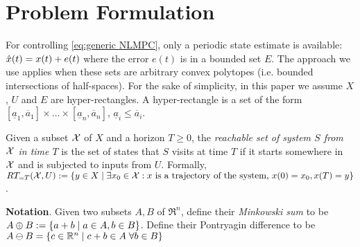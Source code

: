 \section{Problem Formulation} 
\label{sec:formulation}
For controlling \eqref{eq:generic NLMPC}, only a periodic state estimate is available: $\hat{x}(t) = x(t) + e(t)$ where the error $e(t)$ is in a bounded set $E$.
The approach we use applies when these sets are arbitrary convex polytopes (i.e. bounded intersections of half-spaces).
For the sake of simplicity, in this paper we assume $X$, $U$ and $E$ are hyper-rectangles.
A hyper-rectangle is a set of the form $[\underline{a}_1, \overline{a}_1] \times \ldots \times  [\underline{a}_n, \overline{a}_n]$, $\underline{a}_i \leq \overline{a}_i$.


Given a subset $\mathcal{X}$ of $X$ and a horizon $T \geq 0$, the \emph{reachable set of system $S$ from $\mathcal{X}$ in time $T$} is the set of states that $S$ visits at time $T$ if it starts somewhere in $\mathcal{X}$ and is subjected to inputs from $U$.
Formally, $RT_{=T}(\mathcal{X},U) := \{y \in X \;|\; \exists x_0 \in \mathcal{X}: x \text{ is a trajectory of the system, }x(0)=x_0, x(T)=y\}$.

\textbf{Notation}.
Given two subsets $A,B$ of $\Re^n$, define their \textit{Minkowski sum} to be $A\oplus B := \{a+b \;|\; a\in A, b\in B\}$.
Define their Pontryagin difference to be $A\ominus B = \{c \in \mathbb{R}^n \;|\; c+b \in A\; \forall b \in B\}$

